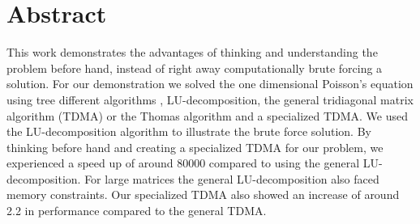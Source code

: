 \section*{Abstract}
This work demonstrates the advantages of thinking and understanding the problem
before hand, instead of right away computationally brute forcing a solution. For
our demonstration we
solved the one dimensional Poisson's equation using tree different algorithms
, LU-decomposition, the general tridiagonal matrix algorithm (TDMA) or the
Thomas algorithm \cite{tridia} and a specialized TDMA.
We used the LU-decomposition algorithm to illustrate the brute force solution.
By thinking before hand and creating a specialized TDMA for our problem, we
experienced a speed up
of around 80000 compared to using the general LU-decomposition. For large
matrices the general LU-decomposition also faced memory constraints. Our
specialized TDMA also showed an increase of around 2.2 in performance compared to the general TDMA.
